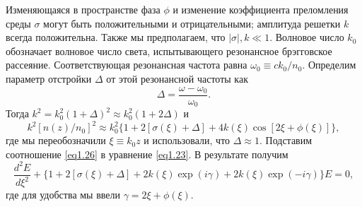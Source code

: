 Изменяющаяся в пространстве фаза $\phi$ и изменение коэффициента преломления среды $\sigma$ могут быть положительными и отрицательными; амплитуда решетки $k$ всегда положительна. Также мы предполагаем, что $|\sigma|,k \ll 1$. Волновое число $k_0$ обозначает волновое число света, испытывающего резонансное брэгговское рассеяние. Соответствующая резонансная частота равна $\omega_0\equiv ck_0/n_0$. Определим параметр отстройки $\Delta$ от этой резонансной частоты как
\begin{equation}\label{eq1.25}
    \Delta=\frac{\omega-\omega_0}{\omega_0}.
\end{equation}
Тогда $k^2=k_0^2(1+\Delta)^2 \approx k_0^2(1+2\Delta)$ и
\begin{equation}\label{eq1.26}
    k^2 [n(z)/n_0 ]^2 \approx k_0^2 \{1 + 2[\sigma(\xi)+\Delta]+4k(\xi)\cos [2\xi+\phi(\xi)]\},
\end{equation}
где мы переобозначили $\xi\equiv k_0 z$ и использовали, что $\Delta\approx 1$. Подставим соотношение \eqref{eq1.26} в уравнение \eqref{eq1.23}. В результате получим
\begin{equation}\label{eq1.27}
    \frac{d^2E}{d\xi^2} + \{1 + 2[\sigma(\xi)+\Delta]+2k(\xi)\exp(i\gamma)+2k(\xi)\exp(-i\gamma)\}E=0,
\end{equation}
где для удобства мы ввели $\gamma=2\xi+\phi(\xi)$.

